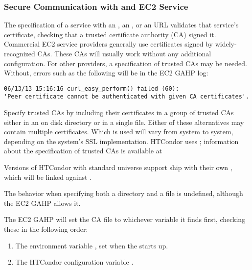 \subsubsection{\label{sec:Amazon-config-certs}Secure Communication with and EC2 Service}

The specification of a service with an , an ,
or an  URL validates that service's certificate,
checking that a trusted certificate authority (CA) signed it.
Commercial EC2 service providers generally use certificates signed by
widely-recognized CAs.
These CAs will usually work without any additional configuration.
For other providers, a specification of trusted CAs may be needed.
Without, errors such as the following will be in the EC2 GAHP log:

\footnotesize
\begin{verbatim}
06/13/13 15:16:16 curl_easy_perform() failed (60):
'Peer certificate cannot be authenticated with given CA certificates'.
\end{verbatim}
\normalsize

Specify trusted CAs by including their certificates in a group of trusted CAs
either in an on disk directory or in a single file.
Either of these alternatives may contain multiple certificates.
Which is used will vary from system to system,
depending on the system's SSL implementation.
HTCondor uses ;
information about the  specification of trusted CAs
is available at


Versions of HTCondor with standard universe support ship with their
own , which will be linked against .

The behavior when specifying both a directory and a file is undefined,
although the EC2 GAHP allows it.

The EC2 GAHP will set the CA file to whichever variable it finds first,
checking these in the following order:

\begin{enumerate}
\item The environment variable ,
  set when the  starts up.
\item The HTCondor configuration variable .
\end{enumerate}


